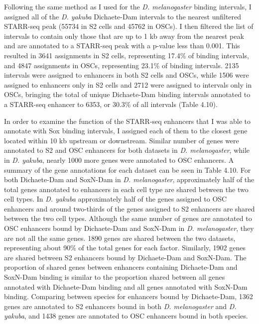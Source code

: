 Following the same method as I used for the \emph{D. melanogaster} binding intervals, I assigned all of the \emph{D. yakuba} Dichaete-Dam intervals to the nearest unfiltered STARR-seq peak (55734 in S2 cells and 45762 in OSCs). I then filtered the list of intervals to contain only those that are up to 1 kb away from the nearest peak and are annotated to a STARR-seq peak with a p-value less than 0.001. This resulted in 3641 assignments in S2 cells, representing 17.4\% of binding intervals, and 4847 assignments in OSCs, representing 23.1\% of binding intervals. 2135 intervals were assigned to enhancers in both S2 cells and OSCs, while 1506 were assigned to enhancers only in S2 cells and 2712 were assigned to intervals only in OSCs, bringing the total of unique Dichaete-Dam binding intervals annotated to a STARR-seq enhancer to 6353, or 30.3\% of all intervals (Table 4.10).

In order to examine the function of the STARR-seq enhancers that I was able to annotate with Sox binding intervals, I assigned each of them to the closest gene located within 10 kb upstream or downstream. Similar number of genes were annotated to S2 and OSC enhancers for both datasets in \emph{D. melanogaster}, while in \emph{D. yakuba}, nearly 1000 more genes were annotated to OSC enhancers. A summary of the gene annotations for each dataset can be seen in Table 4.10. For both Dichaete-Dam and SoxN-Dam in \emph{D. melanogaster}, approximately half of the total genes annotated to enhancers in each cell type are shared between the two cell types. In \emph{D. yakuba} approximately half of the genes assigned to OSC enhancers and around two-thirds of the genes assigned to S2 enhancers are shared between the two cell types. Although the same number of genes are annotated to OSC enhancers bound by Dichaete-Dam and SoxN-Dam in \emph{D. melanogaster}, they are not all the same genes. 1890 genes are shared between the two datasets, representing about 90\% of the total genes for each factor. Similarly, 1902 genes are shared between S2 enhancers bound by Dichaete-Dam and SoxN-Dam. The proportion of shared genes between enhancers containing Dichaete-Dam and SoxN-Dam binding is similar to the proportion shared between all genes annotated with Dichaete-Dam binding and all genes annotated with SoxN-Dam binding. Comparing between species for enhancers bound by Dichaete-Dam, 1362 genes are annotated to S2 enhancers bound in both \emph{D. melanogaster} and \emph{D. yakuba}, and 1438 genes are annotated to OSC enhancers bound in both species.

